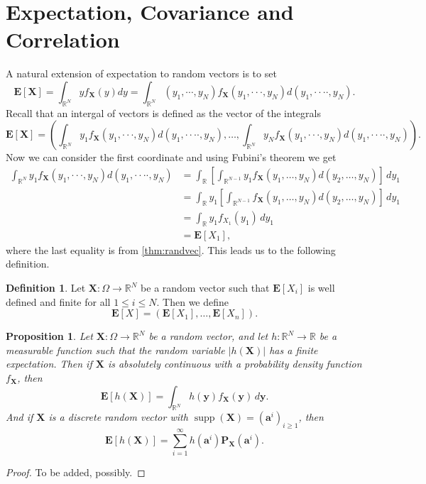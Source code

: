 \documentclass[11pt,a4paper]{article}
\theoremstyle{definition}
\newtheorem{definition}{Definition}[section]
\theoremstyle{plain}
\newtheorem{proposition}[theorem]{Proposition}
\DeclareMathOperator{\supp}{supp}
\newcommand{\R}{\mathbb{R}}
\newcommand{\E}{\mathbf{E}}
\newcommand{\Prob}{\mathbf{P}}
\newcommand{\abs}[1]{\left\lvert #1\right\rvert}
\renewcommand{\vec}[1]{\boldsymbol{\mathbf{#1}}}
\begin{document}
  \section{Expectation, Covariance and Correlation}
  A natural extension of expectation to random vectors is to set
  \[
    \E[\vec{X}] =
    \int_{\R^N} y f_{\vec{X}}(y)dy =
    \int_{\mathbb{R}^{N}} 
    \left(y_{1},\cdots,y_{N}\right)
    f_{\vec{X}} (y_{1},\cdot\cdot\cdot,y_{N})
    d(y_{1},\cdot\cdot\cdot\cdot,y_{N}).
  \]
  Recall that an intergal of vectors is defined as the vector of the
  integrals
  \[
    \E[\vec{X}] =
    \left(
    \int_{\mathbb{R}^{N}} 
    y_1 f_{\vec{X}} (y_{1},\cdot\cdot\cdot,y_{N})
    d(y_{1},\cdot\cdot\cdot\cdot,y_{N})
    ,\dots,
    \int_{\mathbb{R}^{N}} 
    y_N f_{\vec{X}} (y_{1},\cdot\cdot\cdot,y_{N})
    d(y_{1},\cdot\cdot\cdot\cdot,y_{N})
    \right).
  \]
  Now we can consider the first coordinate and using Fubini's theorem we
  get
  \begin{align*}
    \int_{\mathbb{R}^{N}} 
    y_1 f_{\vec{X}} (y_{1},\cdot\cdot\cdot,y_{N})
    d(y_{1},\cdot\cdot\cdot\cdot,y_{N}) &=
    \int_{\mathbb{R}}
    \left[\int_{\mathbb{R}^{N-1}}
    y_{1}f_{\vec{X}}(y_{1},\dots,y_{N}) d(y_{2},\dots, y_{N})\right]\,dy_{1} \\
    &= \int_{\mathbb{R}} y_1
    \left[\int_{\mathbb{R}^{N-1}}
    f_{\vec{X}}(y_{1},\dots,y_{N}) d(y_{2},\dots, y_{N})\right]\,dy_{1} \\
    &= \int_{\mathbb{R}} y_1
    f_{X_1}(y_1)\,dy_1 \\
    &= \E[X_1],
  \end{align*}
  where the last equality is from \autoref{thm:randvec}.
  This leads us to the following definition.
  \begin{definition}
    Let $\vec{X} \colon \Omega \to \R^N$ be a random vector such
    that $\E[X_i]$ is well defined and finite for all $1 \le i \le N$.
    Then we define
    \[
      \E[X] = (\E[X_1],\dots,\E[X_n]).
    \]
  \end{definition}

  \begin{proposition}
    Let $\vec{X} \colon \Omega \to \R^N$ be a random vector, and let
    $h \colon \R^N \to \R$ be a measurable function such that the
    random variable $\abs{h(\vec{X})}$ has a finite expectation.
    Then if $\vec{X}$ is absolutely continuous with a probability density
    function $f_{\vec{X}}$, then
    \[
      \E[h(\vec{X})] =
      \int_{\R^N} h(\vec{y}) f_{\vec{X}}(\vec{y})\,d\vec{y}.
    \]
    And if $\vec{X}$ is a discrete random vector with
    $\supp(\vec{X}) = (\vec{a}^i)_{i \geq 1}$, then
    \[
      \E[h(\vec{X})] =
      \sum_{i=1}^{\infty} h(\vec{a}^i) \Prob_{\vec{X}}(\vec{a}^i).
    \]
  \end{proposition}
  \begin{proof}
    To be added, possibly.
  \end{proof}
\end{document}

